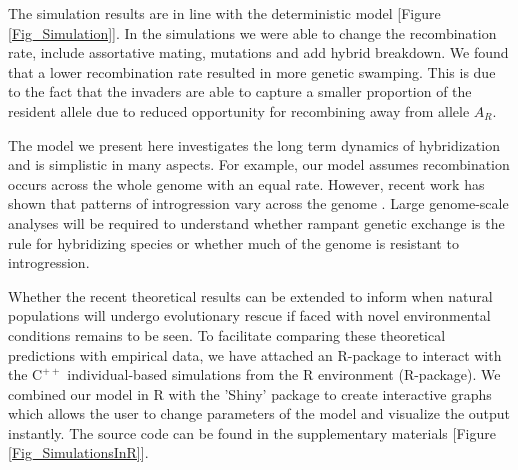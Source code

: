 \documentclass[a4paper,10pt]{article}
\begin{document}
	The simulation results are in line with the deterministic model [Figure \ref{Fig_Simulation}]. In the simulations we were able to change the recombination rate, include assortative mating, mutations and add hybrid breakdown. We found that a lower recombination rate resulted in more genetic swamping. This is due to the fact that the invaders are able to capture a smaller proportion of the resident allele due to reduced opportunity for recombining away from allele $A_R$. 
		
	The model we present here investigates the long term dynamics of hybridization and is simplistic in many aspects. For example, our model assumes recombination occurs across the whole genome with an equal rate. However, recent work has shown that patterns of introgression vary across the genome \cite{baack2007genomic}. Large genome-scale analyses will be required to understand whether rampant genetic exchange is the rule for hybridizing species or whether much of the genome is resistant to introgression. 
	
	Whether the recent theoretical results can be extended to inform when natural populations will undergo evolutionary rescue if faced with novel environmental conditions remains to be seen. To facilitate comparing these theoretical predictions with empirical data, we have attached an R-package to interact with the $\text{C}^{++}$ individual-based simulations from the R environment (R-package). We combined our model in R with the 'Shiny' package \cite{shiny} to create interactive graphs which allows the user to change parameters of the model and visualize the output instantly. The source code can be found in the supplementary materials [Figure \ref{Fig_SimulationsInR}].
	
	
	
\end{document}
